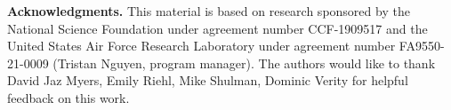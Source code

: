 \documentclass{llncs}
\begin{document}



\textbf{Acknowledgments.}  This material is based on research sponsored
by the National Science Foundation under agreement number CCF-1909517
and the United States Air Force Research Laboratory under agreement
number FA9550-21-0009 (Tristan Nguyen, program manager).
The authors would like to thank David Jaz Myers, Emily Riehl, Mike
Shulman, Dominic Verity for helpful feedback on this work.

\end{document}
